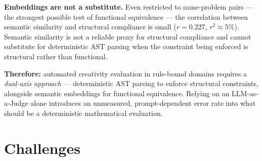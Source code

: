 \documentclass{article}
\begin{document}
\textbf{Embeddings are not a substitute.} Even restricted to same-problem
pairs --- the strongest possible test of functional equivalence --- the
correlation between semantic similarity and structural compliance is small
($r=0.227$, $r^2\approx5\%$). Semantic similarity is not a reliable proxy for
structural compliance and cannot substitute for deterministic AST parsing
when the constraint being enforced is structural rather than functional.

\textbf{Therefore:} automated creativity evaluation in rule-bound domains
requires a \emph{dual-axis approach} --- deterministic AST parsing to enforce
structural constraints, alongside semantic embeddings for functional
equivalence. Relying on an LLM-as-a-Judge alone introduces an unmeasured,
prompt-dependent error rate into what should be a deterministic mathematical
evaluation.

\section{Challenges}
\end{document}
